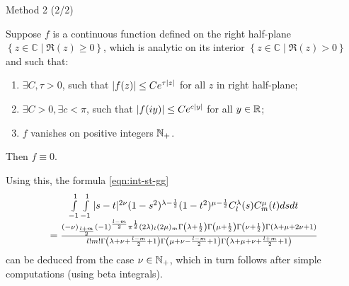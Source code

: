 \documentclass[pdf,notes]{beamer}
\begin{document}
\begin{frame}{Method 2 (2/2)}
			\vspace{-0.2cm}
	\begin{fact}
		Suppose $f$ is a continuous function defined on the right half-plane $\left\{ z\in\mathbb{C}\mid \Re(z)\ge0 \right\}$, which
		is analytic on its interior $\left\{ z\in\mathbb{C}\mid\Re(z)>0 \right\}$ and such that:\begin{enumerate}
			\item $\exists C,\tau>0$, such that $\left|f(z)\right|\le C e^{\tau\left|z\right|}$ for all $z$ in right half-plane;
			\item $\exists C>0,\exists c<\pi$, such that $\left|f(iy)\right|\le Ce^{c\left|y\right|}$ for all $y\in\mathbb{R}$;
			\item $f$ vanishes on positive integers $\mathbb{N}_+$.
		\end{enumerate}
		Then $f\equiv0$.
	\end{fact}
	Using this, the formula \eqref{eqn:int-st-gg} 
			\vspace{-0.2cm}
			{\scriptsize
		\begin{equation*}
			\vspace{-0.2cm}
			\begin{array}[]{c}
			\int_{- 1}^1 \int_{- 1}^1 | s - t |^{2 \nu} (1 - s^2)^{\lambda - \frac{1}{2}}
			(1 - t^2)^{\mu - \frac{1}{2}} C_l^{\lambda} (s) C_m^{\mu} (t) d s d t\\
			=\frac{(- \nu)_{\frac{l + m}{2}} (- 1)^{\frac{l - m}{2}} \pi^{\frac{1}{2}} (2
			\lambda)_l (2 \mu)_m \Gamma \left( \lambda + \frac{1}{2} \right) \Gamma \left(
			\mu + \frac{1}{2} \right) \Gamma \left( \nu + \frac{1}{2} \right) \Gamma
		(\lambda + \mu + 2 \nu + 1)}{l!m! \Gamma \left( \lambda + \nu + \frac{l -
		m}{2} + 1 \right) \Gamma \left( \mu + \nu - \frac{l - m}{2} + 1 \right) \Gamma
		\left( \lambda + \mu + \nu + \frac{l + m}{2} + 1 \right)}
			\end{array}
		\end{equation*}
	}
can be deduced from the case $\nu\in\mathbb{N}_{+}$, which in turn follows after simple computations (using beta integrals).
\end{frame}
\end{document}
